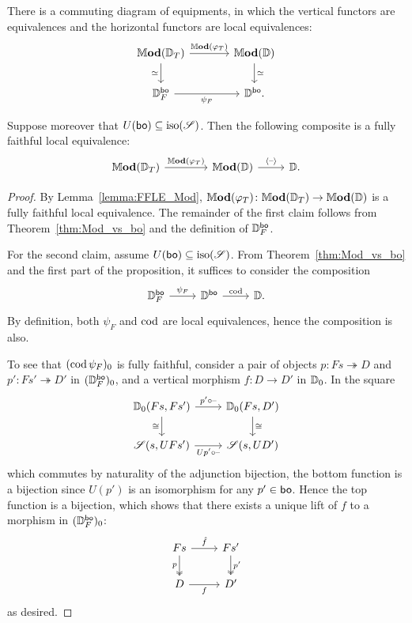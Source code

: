 \documentclass[11pt,oneside,article]{memoir}
\begin{document}
\begin{proposition}
      \label{prop:objectfree_Mod_bo}
   There is a commuting diagram of equipments, in which the vertical functors are equivalences and the horizontal functors are local equivalences:
   \[ \begin{tikzcd}[column sep=large]
      \dMod(\dcat{D}_T) \ar[r,"\dMod(\varphi_T)"] \ar[d,"\equiv"']
         & \dMod(\dcat{D}) \ar[d,"\equiv"] \\
      \dcat{D}_F^{\bo} \ar[r,"\psi_F"'] & \dcat{D}^{\bo}.
   \end{tikzcd} \]

   Suppose moreover that $U(\mathsf{bo})\subseteq\mathrm{iso}(\mathscr{S})$. Then the following composite is a
   fully faithful local equivalence:
   \[ \begin{tikzcd}
      \dMod(\dcat{D}_T)\ar[r,"\dMod(\varphi_T)"] &[1.5em] \dMod(\dcat{D}) \ar[r,"\ColDash"] & \dcat{D}.
   \end{tikzcd} \]
\end{proposition}
\begin{proof}
   By Lemma~\ref{lemma:FFLE_Mod}, $\mathbb{M}\mathbf{od}(\varphi_T)\colon\mathbb{M}\mathbf{od}(\mathbb{D}_T)\to\mathbb{M}\mathbf{od}(\mathbb{D})$ is a fully faithful local equivalence.  The remainder of the first claim follows from Theorem~\ref{thm:Mod_vs_bo} and the definition of $\mathbb{D}^{\mathsf{bo}}_F$.

   For the second claim, assume $U(\mathsf{bo})\subseteq\mathrm{iso}(\mathscr{S})$. From Theorem~\ref{thm:Mod_vs_bo} and the first part of the proposition, it suffices to consider the composition
   \[ \begin{tikzcd}
      \dcat{D}^{\bo}_F \ar[r,"\psi_F"] & \dcat{D}^{\bo} \ar[r,"\cod"] & \dcat{D}.
   \end{tikzcd} \]
   By definition, both $\psi_F$ and $\operatorname{cod}$ are local equivalences, hence the composition is also.

   To see that $(\operatorname{cod}\psi_F)_0$ is fully faithful, consider a pair of objects $p\colon
   Fs\twoheadrightarrow D$ and $p'\colon Fs'\twoheadrightarrow D'$ in $(\mathbb{D}_F^{\mathsf{bo}})_0$, and a
   vertical morphism $f\colon D\to D'$ in $\mathbb{D}_0$. In the square
   \[ \begin{tikzcd}
      \dcat{D}_0(Fs,Fs') \ar[r,"p'\circ\textrm{--}"] \ar[d,"\iso"']
         & \dcat{D}_0(Fs,D') \ar[d,"\iso"] \\
      \cat{S}(s,UFs') \ar[r,"Up'\circ\textrm{--}"']
         & \cat{S}(s,UD')
   \end{tikzcd} \]
   which commutes by naturality of the adjunction bijection, the bottom function is a bijection
   since $U(p')$ is an isomorphism for any $p'\in\mathsf{bo}$. Hence the top
   function is a bijection, which shows that there exists a unique lift of $f$ to a morphism in
   $(\mathbb{D}_F^{\mathsf{bo}})_0$:
   \[ \begin{tikzcd}
      Fs \ar[r,"\hat{f}"] \ar[d,two heads,"p"']
         & Fs' \ar[d,two heads,"p'"] \\
      D \ar[r,"f"'] & D'
   \end{tikzcd} \]
   as desired.
\end{proof}
\end{document}

